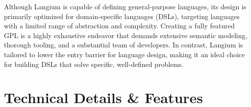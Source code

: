 Although Langium is capable of defining general-purpose languages, its design is primarily optimized for domain-specific languages (DSLs), targeting languages with a limited range of abstraction and complexity.
Creating a fully featured GPL is a highly exhaustive endeavor that demands extensive semantic modeling, thorough tooling, and a substantial team of developers.
In contrast, Langium is tailored to lower the entry barrier for language design, making it an ideal choice for building DSLs that solve specific, well-defined problems.
\\

\section*{Technical Details \& Features}

